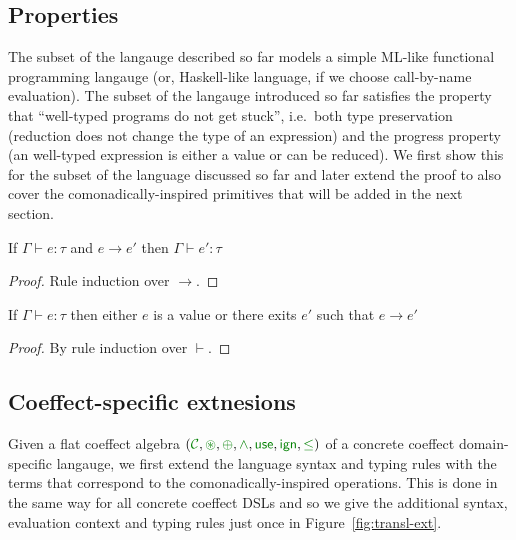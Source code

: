 
\subsection{Properties}

The subset of the langauge described so far models a simple ML-like functional programming 
langauge (or, Haskell-like language, if we choose call-by-name evaluation). The subset of the
langauge introduced so far satisfies the property that ``well-typed programs do not get stuck'',
i.e.~both type preservation (reduction does not change the type of an expression) and the progress 
property (an well-typed expression is either a value or can be reduced).
We first show this for the subset of the language discussed so far and later extend the proof to 
also cover the comonadically-inspired primitives that will be added in the next section.

\begin{theorem}
  If $\Gamma \vdash e : \tau$ and $e \rightarrow e'$ then $\Gamma \vdash e' : \tau$
\end{theorem}
\begin{proof}
  Rule induction over $\rightarrow$.
\end{proof}

\begin{theorem}[Progress]
  If $\Gamma \vdash e : \tau$ then either $e$ is a value or there exits $e'$ such that $e \rightarrow e'$
\end{theorem}
\begin{proof}
  By rule induction over $\vdash$.
\end{proof}


\subsection{Coeffect-specific extnesions}

Given a flat coeffect algebra $(\C, \cseq, \cpar, \czip, \cunit, \czero, \cleq)$ of a concrete 
coeffect domain-specific langauge, we first extend the language syntax and typing rules with 
the terms that correspond to the comonadically-inspired operations. This is done in the same way
for all concrete coeffect DSLs and so we give the additional syntax, evaluation context and 
typing rules just once in Figure~\ref{fig:transl-ext}.

